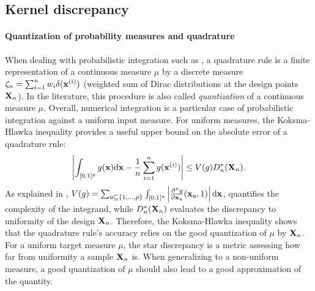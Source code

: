 \subsection{Kernel discrepancy}
\paragraph{Quantization of probability measures and quadrature}
When dealing with probabilistic integration such as , a quadrature rule is a finite representation of a continuous measure $\mu$ by a discrete measure $\zeta_n = \sum_{i=1}^n w_i \delta({\bf x}^{(i)})$ (weighted sum of Dirac distributions at the design points ${\bf X}_n$). 
In the literature, this procedure is also called \emph{quantization} of a continuous measure $\mu$. 
Overall, numerical integration is a particular case of probabilistic integration against a uniform input measure. 
For uniform measures, the Koksma-Hlawka inequality \citep{morokoff_1995} provides a useful upper bound on the absolute error of a quadrature rule: 
\begin{equation}
    \left| \int_{[0, 1]^p} g({\bf x}) \mathrm{d}{\bf x} - \frac1n \sum_{i=1}^n g({\bf x}^{(i)})\right| \leq  V(g) D_n^*({\bf X}_n).
    \label{eq:KH_inequality}
\end{equation}
As explained in \cite{oates_21}, $V(g) = \sum_{\mathfrak{u}\subseteq\{1, \dots, p \}} \int_{[0, 1]^\mathfrak{u}} \left| \frac{\partial^{\mathfrak{u}}g}{\partial {\bf x}_{\mathfrak{u}}}({\bf x}_{\mathfrak{u}}, 1)\right| \mathrm{d}{\bf x}$, quantifies the complexity of the integrand, while $D_n^*({\bf X}_n)$ evaluates the discrepancy to uniformity of the design ${\bf X}_n$. 
Therefore, the Koksma-Hlawka inequality shows that the quadrature rule's accuracy relies on the good quantization of $\mu$ by ${\bf X}_n$. For a uniform target measure $\mu$, the star discrepancy is a metric assessing how far from uniformity a sample ${\bf X}_n$ is. 
When generalizing to a non-uniform measure, a good quantization of $\mu$ should also lead to a good approximation of the quantity. %

